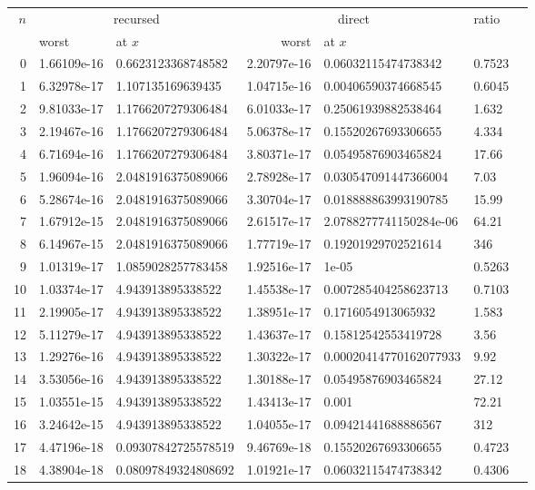 \begin{tabular}{rllrllr}
\toprule
$n$ & \multicolumn{2}{c}{recursed} & \multicolumn{2}{c}{direct} & ratio\\
\cmidrule(lr){2-3}\cmidrule(lr){4-5}
 & worst & at $x$ & worst & at $x$ &\\
\midrule
 0 & 1.66109e-16 & 0.6623123368748582 & 2.20797e-16 & 0.06032115474738342 & 0.7523\\
 1 & 6.32978e-17 & 1.107135169639435 & 1.04715e-16 & 0.00406590374668545 & 0.6045\\
 2 & 9.81033e-17 & 1.1766207279306484 & 6.01033e-17 & 0.25061939882538464 & 1.632\\
 3 & 2.19467e-16 & 1.1766207279306484 & 5.06378e-17 & 0.15520267693306655 & 4.334\\
 4 & 6.71694e-16 & 1.1766207279306484 & 3.80371e-17 & 0.05495876903465824 & 17.66\\
 5 & 1.96094e-16 & 2.0481916375089066 & 2.78928e-17 & 0.030547091447366004 & 7.03\\
 6 & 5.28674e-16 & 2.0481916375089066 & 3.30704e-17 & 0.018888863993190785 & 15.99\\
 7 & 1.67912e-15 & 2.0481916375089066 & 2.61517e-17 & 2.0788277741150284e-06 & 64.21\\
 8 & 6.14967e-15 & 2.0481916375089066 & 1.77719e-17 & 0.19201929702521614 & 346\\
 9 & 1.01319e-17 & 1.0859028257783458 & 1.92516e-17 & 1e-05 & 0.5263\\
10 & 1.03374e-17 & 4.943913895338522 & 1.45538e-17 & 0.007285404258623713 & 0.7103\\
11 & 2.19905e-17 & 4.943913895338522 & 1.38951e-17 & 0.1716054913065932 & 1.583\\
12 & 5.11279e-17 & 4.943913895338522 & 1.43637e-17 & 0.15812542553419728 & 3.56\\
13 & 1.29276e-16 & 4.943913895338522 & 1.30322e-17 & 0.00020414770162077933 & 9.92\\
14 & 3.53056e-16 & 4.943913895338522 & 1.30188e-17 & 0.05495876903465824 & 27.12\\
15 & 1.03551e-15 & 4.943913895338522 & 1.43413e-17 & 0.001 & 72.21\\
16 & 3.24642e-15 & 4.943913895338522 & 1.04055e-17 & 0.09421441688886567 & 312\\
17 & 4.47196e-18 & 0.09307842725578519 & 9.46769e-18 & 0.15520267693306655 & 0.4723\\
18 & 4.38904e-18 & 0.08097849324808692 & 1.01921e-17 & 0.06032115474738342 & 0.4306\\

\end{tabular}
